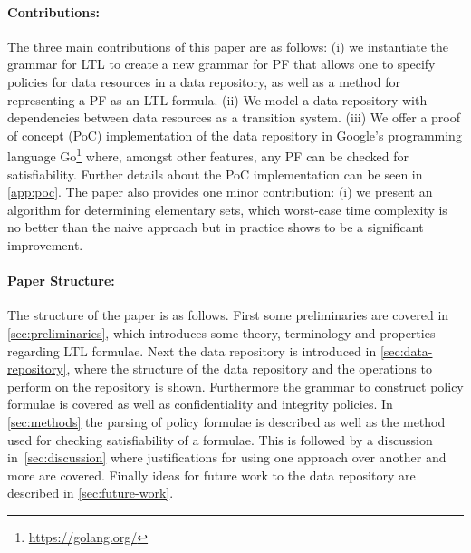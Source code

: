 \paragraph{Contributions:} The three main contributions of this paper are as follows: (i) we instantiate the grammar for LTL to create a new grammar for PF that allows one to specify policies for data resources in a data repository, as well as a method for representing a PF as an LTL formula. (ii) We model a data repository with dependencies between data resources as a transition system. (iii) We offer a proof of concept (PoC) implementation of the data repository in Google's programming language Go\footnote{\href{https://golang.org/}{https://golang.org/}} where, amongst other features, any PF can be checked for satisfiability. Further details about the PoC implementation can be seen in \autoref{app:poc}. The paper also provides one minor contribution: (i) we present an algorithm for determining elementary sets, which worst-case time complexity is no better than the naive approach but in practice shows to be a significant improvement.

\paragraph{Paper Structure:}
The structure of the paper is as follows. First some preliminaries are covered in \autoref{sec:preliminaries}, which introduces some theory, terminology and properties regarding LTL formulae. Next the data repository is introduced in \autoref{sec:data-repository}, where the structure of the data repository and the operations to perform on the repository is shown. Furthermore the grammar to construct policy formulae is covered as well as confidentiality and integrity policies. In \autoref{sec:methods} the parsing of policy formulae is described as well as the method used for checking satisfiability of a formulae. This is followed by a discussion in~\autoref{sec:discussion} where justifications for using one approach over another and more are covered. Finally ideas for future work to the data repository are described in \autoref{sec:future-work}.
